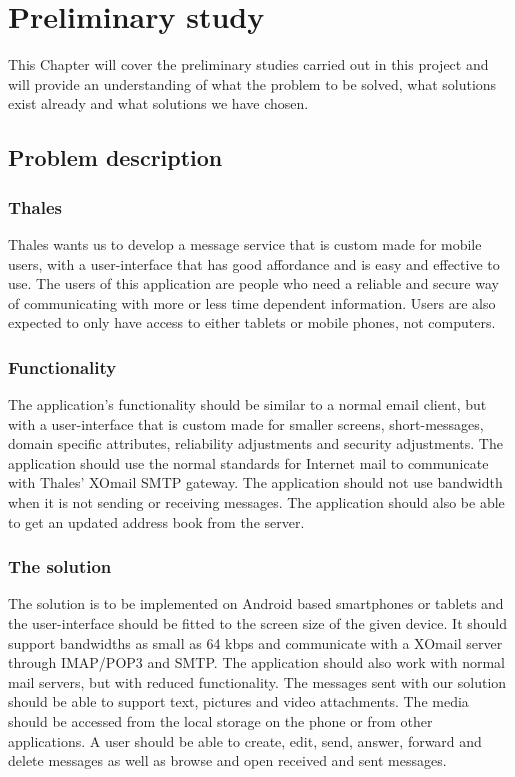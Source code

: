 \chapter{Preliminary study}

This Chapter will cover the preliminary studies carried out in this project and will provide an understanding of what the problem to be solved, what solutions exist already and what solutions we have chosen.

\section{Problem description}

\subsection{Thales}
Thales wants us to develop a message service that is custom made for mobile users, with a user-interface that has good affordance and is easy and effective to use.
\newline
\newline
The users of this application are people who need a reliable and secure way of communicating with more or less time dependent information. Users are also expected to only have access to either tablets or mobile phones, not computers.

\subsection{Functionality}
The application’s functionality should be similar to a normal email client, but with a user-interface that is custom made for smaller screens, short-messages, domain specific attributes, reliability adjustments and security adjustments. The application should use the normal standards for Internet mail to communicate with Thales’ XOmail SMTP gateway.
\newline
\newline
The application should not use bandwidth when it is not sending or receiving messages. The application should also be able to get an updated address book from the server.

\subsection{The solution}
The solution is to be implemented on Android based smartphones or tablets and the user-interface should be fitted to the screen size of the given device. It should support bandwidths as small as 64 kbps and communicate with a XOmail
server through IMAP/POP3 and SMTP. The application should also work with normal mail servers, but with reduced functionality.
\newline
\newline
The messages sent with our solution should be able to support text, pictures and video attachments. The media should be accessed from the local storage on the phone or from other applications. A user should be able to create, edit, send, answer, forward and delete messages as well as browse and open received and sent messages.

